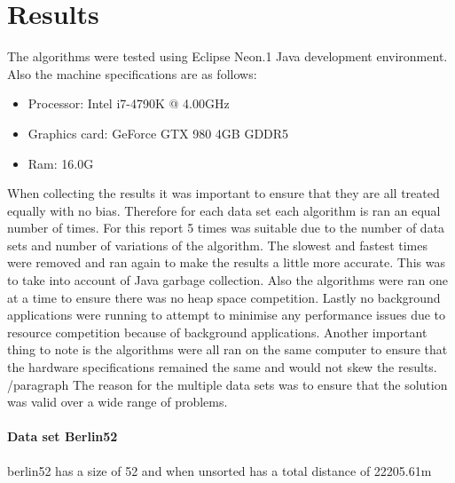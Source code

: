 \documentclass[conference,backref=page]{acmsiggraph}
\begin{document}
\section{Results}

The algorithms were tested using Eclipse Neon.1 Java development environment. Also the machine specifications are as follows:
\begin{itemize}
\item Processor:	Intel i7-4790K @ 4.00GHz
\item Graphics card:	GeForce GTX 980	4GB GDDR5
\item Ram:	16.0G

\end{itemize}

When collecting the results it was important to ensure that they are all treated equally with no bias. Therefore for each data set each algorithm is ran an equal number of times. For this report 5 times was suitable due to the number of data sets and number of variations of the algorithm. The slowest and fastest times were removed and ran again to make the results a little more accurate. This was to take into account of Java garbage collection. Also the algorithms were ran one at a time to ensure there was no heap space competition. Lastly no background applications were running to attempt to minimise any performance issues due to resource competition because of background applications. Another important thing to note is the algorithms were all ran on the same computer to ensure that the hardware specifications remained the same and would not skew the results.
/paragraph{}
The reason for the multiple data sets was to ensure that the solution was valid over a wide range of problems.

\paragraph{Data set Berlin52} \hfill

berlin52 has a size of 52 and when unsorted has a total distance of 22205.61m
\end{document}
